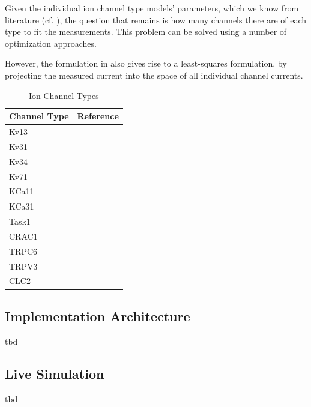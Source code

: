 \documentclass[USenglish,twocolumn]{article}
\begin{document}
  Given the individual ion channel type models' parameters, which we know from literature (cf. ), the question that remains is how many channels there are of each type to fit the measurements.
  This problem can be solved using a number of optimization approaches.

  However, the formulation in  also gives rise to a least-squares formulation, by projecting the measured current into the space of all individual channel currents.

  \begin{table}
    \caption{Ion Channel Types}
    \begin{tabular}{ll}
      \textbf{Channel Type} & \textbf{Reference}            \\
      \midrule
      Kv13                  & \cite{1998-potassium-channel} \\
      Kv31                  & \cite{1998-potassium-channel} \\
      Kv34                  & \cite{1998-potassium-channel} \\
      Kv71                  & \cite{1998-potassium-channel} \\
      KCa11                 & \cite{1998-potassium-channel} \\
      KCa31                 & \cite{1998-potassium-channel} \\
      Task1                 & \cite{1998-potassium-channel} \\
      CRAC1                 & \cite{1998-potassium-channel} \\
      TRPC6                 & \cite{1998-potassium-channel} \\
      TRPV3                 & \cite{1998-potassium-channel} \\
      CLC2                  & \cite{1998-potassium-channel} \\
    \end{tabular}
    \label{table:channel-types}
  \end{table}

  \subsection{Implementation Architecture}
  tbd

  \subsection{Live Simulation}
  tbd
\end{document}
